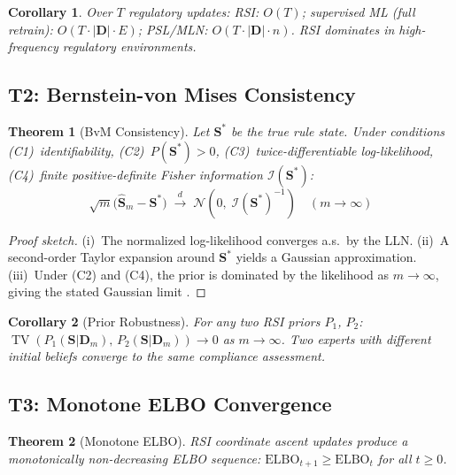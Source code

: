 \documentclass[letterpaper]{article}
\newtheorem{theorem}{Theorem}
\newtheorem{corollary}{Corollary}[theorem]
\begin{document}
\begin{corollary}
Over $T$ regulatory updates:
RSI: $O(T)$;
supervised ML (full retrain): $O(T \cdot |\mathbf{D}| \cdot E)$;
PSL/MLN: $O(T \cdot |\mathbf{D}| \cdot n)$.
RSI dominates in high-frequency regulatory environments.
\end{corollary}

\subsection{T2: Bernstein-von Mises Consistency}

\begin{theorem}[BvM Consistency]
\label{thm:bvm}
Let $\mathbf{S}^*$ be the true rule state. Under conditions
(C1)~identifiability, (C2)~$P(\mathbf{S}^*) > 0$,
(C3)~twice-differentiable log-likelihood,
(C4)~finite positive-definite Fisher information
$\mathcal{I}(\mathbf{S}^*)$:
\[
  \sqrt{m}\bigl(\hat{\mathbf{S}}_m - \mathbf{S}^*\bigr)
  \;\xrightarrow{d}\;
  \mathcal{N}\!\left(0,\;\mathcal{I}(\mathbf{S}^*)^{-1}\right)
  \quad (m \to \infty)
\]
\end{theorem}

\begin{proof}[Proof sketch]
(i)~The normalized log-likelihood converges a.s.\ by the LLN.
(ii)~A second-order Taylor expansion around $\mathbf{S}^*$ yields
a Gaussian approximation.
(iii)~Under (C2) and (C4), the prior is dominated by the likelihood
as $m \to \infty$, giving the stated Gaussian limit
\citep{van2000asymptotic}.
\end{proof}

\begin{corollary}[Prior Robustness]
For any two RSI priors $P_1$, $P_2$:
$\operatorname{TV}(P_1(\mathbf{S}|\mathbf{D}_m),\,
P_2(\mathbf{S}|\mathbf{D}_m)) \to 0$ as $m \to \infty$.
Two experts with different initial beliefs converge to the same
compliance assessment.
\end{corollary}

\subsection{T3: Monotone ELBO Convergence}

\begin{theorem}[Monotone ELBO]
\label{thm:elbo}
RSI coordinate ascent updates produce a monotonically non-decreasing
ELBO sequence: $\mathrm{ELBO}_{t+1} \geq \mathrm{ELBO}_t$ for all
$t \geq 0$.
\end{theorem}
\end{document}
